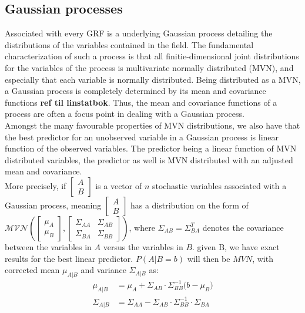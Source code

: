 \subsection{Gaussian processes} \label{sec:gaussian_processes}
Associated with every GRF is a underlying Gaussian process detailing the distributions of the variables contained in the field. The fundamental characterization of such a process is that all finitie-dimensional joint distributions for the variables of the process is multivariate normally distributed (MVN), and especially that each variable is normally distributed. Being distributed as a MVN, a Gaussian process is completely determined by its mean and covariance functions \textbf{ref til linstatbok}. Thus, the mean and covariance functions of a process are often a focus point in dealing with a Gaussian process. \\

Amongst the many favourable properties of MVN distributions, we also have that the best predictor for an unobserved variable in a Gaussian process is linear function of the observed variables. The predictor being a linear function of MVN distributed variables, the predictor as well is MVN distributed with an adjusted mean and covariance. \\ 

More precisely, if $\begin{bmatrix} A \\ B \end{bmatrix}$ is a vector of $n$ stochastic variables associated with a Gaussian process, meaning $\begin{bmatrix} A \\ B \end{bmatrix}$ has a distribution on the form of $\mathcal{MVN}(\begin{bmatrix} \mu_A \\ \mu_B \end{bmatrix}, \begin{bmatrix} \Sigma_{AA} & \Sigma_{AB} \\ \Sigma_{BA} & \Sigma_{BB} \end{bmatrix})$, where $\Sigma_{AB} = \Sigma_{BA}^T$ denotes the covariance between the variables in $A$ versus the variables in $B$.  given B, we have exact results for the best linear predictor. $P(A | B = b)$ will then be $MVN$, with corrected mean $\mu_{A | B}$ and variance $\Sigma_{A | B}$ as:
\begin{align}
\mu_{A | B} &= \mu_A + \Sigma_{AB}\cdot \Sigma_{BB}^{-1}\big( b - \mu_B \big) \label{eq:gaussian_conditional_expectancy} \\
\Sigma_{A | B} &= \Sigma_{AA} - \Sigma_{AB} \cdot \Sigma_{BB}^{-1} \cdot \Sigma_{BA} \label{eq:gaussian_conditional_variance}
\end{align}

